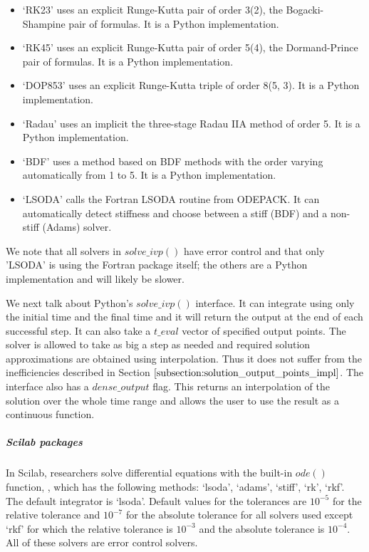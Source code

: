 \begin{itemize}
\item `RK23' uses an explicit Runge-Kutta pair of order 3(2), the Bogacki-Shampine pair of formulas. It is a Python implementation.

\item `RK45' uses an explicit Runge-Kutta pair of order 5(4), the Dormand-Prince pair of formulas. It is a Python implementation.

\item `DOP853' uses an explicit Runge-Kutta triple of order 8(5, 3). It is a Python implementation.

\item `Radau' uses an implicit the three-stage Radau IIA method of order 5. It is a Python implementation.

\item `BDF' uses a method based on BDF methods with the order varying automatically from 1 to 5. It is a Python implementation.

\item `LSODA' calls the Fortran LSODA routine from ODEPACK. It can automatically detect stiffness and choose between a stiff (BDF) and a non-stiff (Adams) solver.
\end{itemize}

We note that all solvers in $solve\_ivp()$ have error control and that only 'LSODA' is using the Fortran package itself; the others are a Python implementation and will likely be slower.

We next talk about Python's $solve\_ivp()$ interface. It can integrate using only the initial time and the final time and it will return the output at the end of each successful step. It can also take a $t\_eval$ vector of specified output points. The solver is allowed to take as big a step as needed and required solution approximations are obtained using interpolation. Thus it does not suffer from the inefficiencies described in Section $\ref{subsection:solution_output_points_impl}$. The interface also has a $dense\_output$ flag. This returns an interpolation of the solution over the whole time range and allows the user to use the result as a continuous function.

\subparagraph{Scilab packages}
In Scilab, researchers solve differential equations with the built-in $ode()$ function, \cite{campbell2010modeling}, which has the following methods: `lsoda', `adams', `stiff', `rk', `rkf'. The default integrator is `lsoda'.
Default values for the tolerances are $10^{-5}$ for the relative tolerance and $10^{-7}$ for the absolute tolerance for all solvers used except `rkf' for which the relative tolerance is $10^{-3}$ and the absolute tolerance is $10^{-4}$. All of these solvers are error control solvers.

